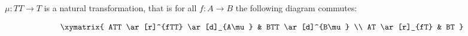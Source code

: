 $\mu: TT \rightarrow T$ is a natural transformation, that is for all $f: A \rightarrow B$ the following diagram commutes:

$$\xymatrix{
ATT \ar[r]^{fTT} \ar[d]_{A\mu} & BTT \ar[d]^{B\mu} \\
AT \ar[r]_{fT} & BT
}$$
